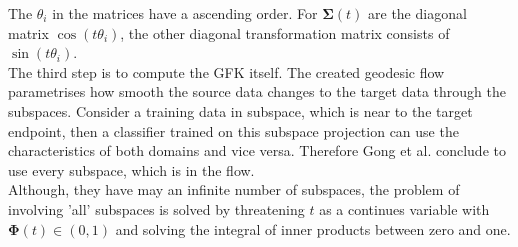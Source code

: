 The $\theta_i$ in the matrices have a ascending order.
For $\boldsymbol{\Sigma}(t)$ are the diagonal matrix $\cos(t\theta_i)$, the other diagonal transformation matrix consists of $\sin(t\theta_i)$.\cite{Gong.}\\
The third step is to compute the \acs{GFK} itself.
The created geodesic flow parametrises how smooth the source data changes to the target data through the subspaces.
Consider a training data in subspace, which is near to the target endpoint, then a classifier trained on this subspace projection can use the characteristics of both domains and vice versa.
Therefore Gong et al. conclude to use every subspace, which is in the flow.\cite{Gong.}\\
Although, they have may an infinite number of subspaces, the problem of involving 'all' subspaces is solved by threatening $t$ as a continues variable with $\boldsymbol{\Phi}(t) \in (0,1)$ and solving the integral of inner products between zero and one.

